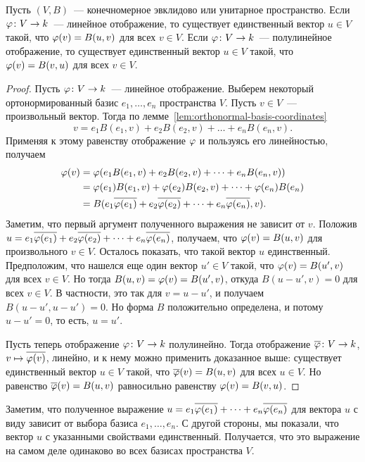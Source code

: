 \begin{theorem}\label{thm:Riesz_theorem}
Пусть $(V,B)$~--- конечномерное эвклидово или унитарное пространство.
Если $\varphi\colon V\to k$~--- линейное отображение, то существует
единственный вектор $u\in V$ такой, что $\varphi(v) = B(u,v)$ для всех $v\in V$.
Если $\varphi\colon V\to k$~--- полулинейное отображение, то существует
единственный вектор $u\in V$ такой, что $\varphi(v) = B(v,u)$ для всех $v\in V$.
\end{theorem}
\begin{proof}
Пусть $\varphi\colon V\to k$~--- линейное отображение.
Выберем некоторый ортонормированный базис $e_1,\dots,e_n$ пространства $V$.
Пусть $v\in V$~--- произвольный вектор.
Тогда по лемме~\ref{lem:orthonormal-basis-coordinates}
$$
v = e_1 B(e_1,v) + e_2 B(e_2,v) + \dots + e_n B(e_n,v).
$$
Применяя к этому равенству отображение $\varphi$ и пользуясь его линейностью, получаем
\begin{align*}
\varphi(v) &= \varphi(e_1 B(e_1,v) + e_2 B(e_2, v) + \dots + e_n B(e_n,v)) \\
&= \varphi(e_1)B(e_1,v) + \varphi(e_2)B(e_2,v) + \dots + \varphi(e_n)B(e_n) \\
&= B(e_1\overline{\varphi(e_1)} + e_2\overline{\varphi(e_2)} + \dots + e_n\overline{\varphi(e_n)},v).
\end{align*}
Заметим, что первый аргумент полученного выражения не зависит от $v$.
Положив $u = e_1\overline{\varphi(e_1)} + e_2\overline{\varphi(e_2)} + \dots
+ e_n\overline{\varphi(e_n)}$, получаем,
что $\varphi(v) = B(u,v)$ для произвольного $v\in V$. Осталось показать, что такой
вектор $u$ единственный. Предположим, что нашелся еще один вектор $u'\in V$
такой, что $\varphi(v) = B(u',v)$ для всех $v\in V$.
Но тогда $B(u,v) = \varphi(v) = B(u',v)$, откуда $B(u-u',v) = 0$ для всех $v\in V$.
В частности, это так для $v = u-u'$, и получаем $B(u-u',u-u') = 0$.
Но форма $B$ положительно определена, и потому $u-u'=0$, то есть, $u=u'$.

Пусть теперь отображение $\varphi\colon V\to k$ полулинейно. Тогда
отображение $\overline{\varphi}\colon V\to k$, $v\mapsto \overline{\varphi(v)}$,
линейно, и к нему можно применить доказанное выше: существует единственный вектор
$u\in V$ такой, что $\overline{\varphi}(v) = B(u,v)$ для всех $u\in V$.
Но равенство $\overline{\varphi}(v) = B(u,v)$ равносильно равенству
$\varphi(v) = B(v,u)$.
\end{proof}

\begin{remark}
Заметим, что полученное выражение
$u = e_1\overline{\varphi(e_1)} + \dots + e_n\overline{\varphi(e_n)}$
для вектора $u$ с виду зависит от выбора базиса $e_1,\dots,e_n$.
С другой стороны, мы показали, что вектор $u$ с указанными свойствами
единственный. Получается, что это выражение на самом деле одинаково
во всех базисах пространства $V$.
\end{remark}

